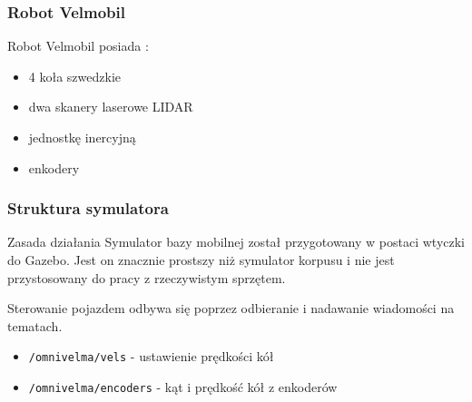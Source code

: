 
\begin{frame}
\frametitle{Robot Velmobil}
Robot Velmobil posiada \cite{walas}:  
\begin{itemize}
	\item 4 koła szwedzkie
	\item dwa skanery laserowe LIDAR
	\item jednostkę inercyjną
	\item enkodery %
\end{itemize}
\end{frame}


\begin{frame}
\frametitle{Struktura symulatora}
\begin{block}{Zasada działania}
Symulator bazy mobilnej został przygotowany w postaci wtyczki do Gazebo. 
Jest on znacznie prostszy niż symulator korpusu i nie jest przystosowany
do pracy z rzeczywistym sprzętem.
\end{block}
\bigskip
Sterowanie pojazdem
odbywa się poprzez odbieranie i nadawanie wiadomości na tematach.
\begin{itemize}
	\item \texttt{/omnivelma/vels} - ustawienie prędkości kół
	\item \texttt{/omnivelma/encoders} - kąt i prędkość kół z enkoderów
\end{itemize}
\end{frame}
